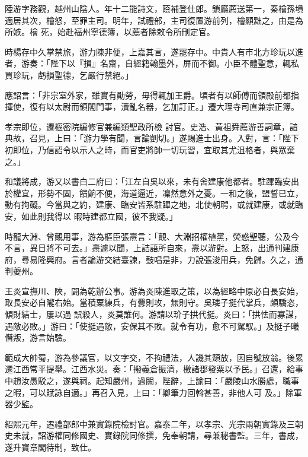 \begin{pinyinscope}
 陸游字務觀，越州山陰人。年十二能詩文，蔭補登仕郎。鎖廳薦送第一，秦檜孫塤適居其次，檜怒，至罪主司。明年，試禮部，主司復置游前列，檜顯黜之，由是為所嫉。檜
 死，始赴福州寧德簿，以薦者除敕令所刪定官。



 時楊存中久掌禁旅，游力陳非便，上嘉其言，遂罷存中。中貴人有市北方珍玩以進者，游奏：「陛下以『損』名齋，自經籍翰墨外，屏而不御。小臣不體聖意，輒私買珍玩，虧損聖德，乞嚴行禁絕。」



 應詔言：「非宗室外家，雖實有勛勞，毋得輒加王爵。頃者有以師傅而領殿前都指揮使，復有以太尉而領閣門事，瀆亂名器，乞加訂正。」遷大理寺司直兼宗正簿。



 孝宗即位，遷樞密院編修官兼編類聖政所檢
 討官。史浩、黃祖舜薦游善詞章，諳典故，召見，上曰：「游力學有聞，言論剴切。」遂賜進士出身。入對，言：「陛下初即位，乃信詔令以示人之時，而官吏將帥一切玩習，宜取其尤沮格者，與眾棄之。」



 和議將成，游又以書白二府曰：「江左自吳以來，未有舍建康他都者。駐蹕臨安出於權宜，形勢不固，饋餉不便，海道逼近，凜然意外之憂。一和之後，盟誓已立，動有拘礙。今當與之約，建康、臨安皆系駐蹕之地，北使朝聘，或就建康，或就臨安，如此則我得以
 暇時建都立國，彼不我疑。」



 時龍大淵、曾覿用事，游為樞臣張燾言：「覿、大淵招權植黨，熒惑聖聽，公及今不言，異日將不可去。」燾遽以聞，上詰語所自來，燾以游對。上怒，出通判建康府，尋易隆興府。言者論游交結臺諫，鼓唱是非，力說張浚用兵，免歸。久之，通判夔州。



 王炎宣撫川、陜，闢為乾辦公事。游為炎陳進取之策，以為經略中原必自長安始，取長安必自隴右始。當積粟練兵，有釁則攻，無則守。吳璘子挺代掌兵，頗驕恣，傾財結士，屢以過
 誤殺人，炎莫誰何。游請以玠子拱代挺。炎曰：「拱怯而寡謀，遇敵必敗。」游曰：「使挺遇敵，安保其不敗。就令有功，愈不可駕馭。」及挺子曦僭叛，游言始驗。



 範成大帥蜀，游為參議官，以文字交，不拘禮法，人譏其頹放，因自號放翁。後累遷江西常平提舉。江西水災。奏：「撥義倉振濟，檄諸郡發粟以予民。」召還，給事中趙汝愚駁之，遂與祠。起知嚴州，過闕，陛辭，上諭曰：「嚴陵山水勝處，職事之暇，可以賦詠自適。」再召入見，上曰：「卿筆力回斡甚善，非他人可
 及。」除軍器少監。



 紹熙元年，遷禮部郎中兼實錄院檢討官。嘉泰二年，以孝宗、光宗兩朝實錄及三朝史未就，詔游權同修國史、實錄院同修撰，免奉朝請，尋兼秘書監。三年，書成，遂升寶章閣待制，致仕。




\end{pinyinscope}
